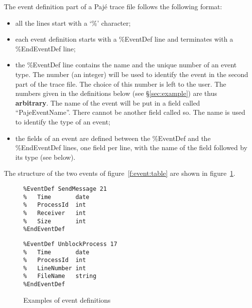 The event definition part of a Pajé trace file follows the following format:
\begin{itemize}
\item all the lines start with a `\%' character;
\item each event definition starts with a \%EventDef
  line and terminates with a \%EndEventDef line;
\item the \%EventDef line contains the name and the unique number of an
  event type.  The number (an integer) will be used to identify the event
  in the second part of the trace file. The choice of this number is
  left to the user. The numbers given in the definitions below (see
  \S\ref{sec:example}) are thus
  \textbf{arbitrary}. The name of the event will be put in a field called
  ``PajeEventName''. There cannot be another field called so. The name is used
  to identify the type of an event;
\item the fields of an event are defined between the \%EventDef and
  the \%EndEventDef lines, one field per line, with the name
  of the field followed by its type (see below).
\end{itemize}

The structure of the two events of figure~\ref{f:event:table} are shown in figure~\ref{f:event:def}.

\begin{figure}
\begin{center}
\begin{minipage}{5.6cm}
\begin{verbatim}
%EventDef SendMessage 21
%   Time       date
%   ProcessId  int
%   Receiver   int
%   Size       int
%EndEventDef
\end{verbatim}
\end{minipage}
\quad\quad
\begin{minipage}{5.6cm}
\begin{verbatim}
%EventDef UnblockProcess 17
%   Time       date
%   ProcessId  int
%   LineNumber int
%   FileName   string
%EndEventDef
\end{verbatim}
\end{minipage}
\end{center}
\caption{Examples of event definitions}
\label{f:event:def}
\end{figure}

